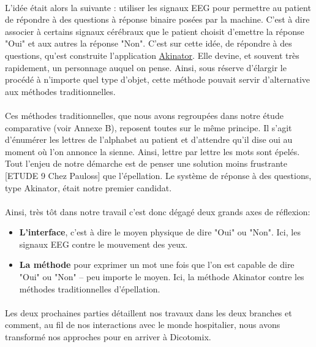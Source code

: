 \documentclass[11pt,a4paper]{article}
\theoremstyle{plain}
\theoremstyle{definition}
\begin{document}
\paragraph{}L'idée était alors la suivante : utiliser les signaux EEG pour permettre au patient de répondre à des questions à réponse binaire posées par la machine.
C'est à dire associer à certains signaux cérébraux que le patient choisit d'emettre la réponse "Oui" et aux autres la réponse "Non". 
C'est sur cette idée, de répondre à des questions, qu'est construite l'application \href{http://fr.akinator.com/}{Akinator}. Elle devine, et souvent très rapidement, 
un personnage auquel on pense. Ainsi, sous réserve d'élargir le procédé à n'importe quel type d'objet, cette méthode pouvait servir d'alternative aux méthodes traditionnelles.
\paragraph{}
Ces méthodes traditionnelles, que nous avons regroupées dans notre étude comparative (voir Annexe B), reposent toutes sur le même principe. Il s'agit d'énumérer les
lettres de l'alphabet au patient et d'attendre qu'il dise oui au moment où l'on annonce la sienne. Ainsi, lettre par lettre les mots sont épelés. Tout l'enjeu de 
notre démarche est de penser une solution moins frustrante [ETUDE 9 Chez Pauloss] que l'épellation. Le système de réponse à des questions, type Akinator, était notre premier candidat.

\paragraph{}Ainsi, très tôt dans notre travail c'est donc dégagé deux grands axes de réflexion:
\begin{itemize}
\item \textbf{L'interface}, c'est à dire le moyen physique de dire "Oui" ou "Non". Ici, les signaux EEG contre le mouvement des yeux.
\item \textbf{La méthode} pour exprimer un mot une fois que l'on est capable de dire "Oui" ou "Non" -- peu importe le moyen. Ici, la méthode Akinator contre 
les méthodes traditionnelles d'épellation.
\end{itemize}

\paragraph{}Les deux prochaines parties détaillent nos travaux dans les deux branches et comment, au fil de nos interactions avec le monde hospitalier, nous avons transformé nos approches
pour en arriver à Dicotomix.
\end{document}
